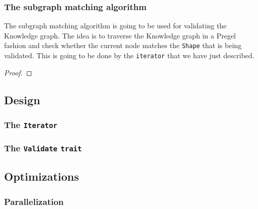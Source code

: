 \subsubsection{The subgraph matching algorithm}

The subgraph matching algorithm is going to be used for validating the Knowledge graph. The idea is to traverse the Knowledge graph in a Pregel fashion and check whether the current node matches the \texttt{Shape} that is being validated. This is going to be done by the \texttt{iterator} that we have just described.

\begin{theorem}

\end{theorem}

\begin{proof}

\end{proof}

\begin{pseudocode}
    
\end{pseudocode}

\subsection{Design}

\subsubsection{The \texttt{Iterator}}

\subsubsection{The \texttt{Validate} \texttt{trait}}

\subsection{Optimizations}

\subsubsection{Parallelization}

